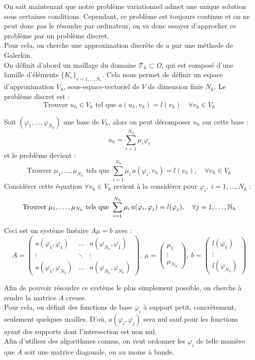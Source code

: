 On sait maintenant que notre problème variationnel admet une unique solution sous certaines conditions. Cependant, ce problème est toujours continue et on ne peut donc pas le résoudre par ordinateur, on va donc essayer d'approcher ce problème par un problème discret.\\
Pour cela, on cherche une approximation discrète de $u$ par une méthode de Galerkin.\\

On définit d'abord un maillage du domaine $\mathcal{T}_h\subset\Omega$, qui est composé d'une famille d'éléments $\{K_e\}_{e=1,\dots,N_e}$. Cela nous permet de définir un espace d'approximation $V_h$, sous-espace-vectoriel de $V$ de dimension finie $N_h$. Le problème discret est :
\[ \mbox{Trouver } u_h\in V_h \mbox{ tel que } a(u_h,v_h)=l(v_h)\quad \forall v_h\in V_h \]

Soit $(\varphi_1,\dots,\varphi_{N_h})$ une base de $V_h$, alors on peut décomposer $u_h$ sur cette base :
\[ u_h = \sum_{i=1}^{N_h} \mu_i\varphi_i \]
et le problème devient :
\[ \mbox{Trouver } \mu_1,\dots,\mu_{N_h} \mbox{ tels que } \sum_{i=1}^{N_h} \mu_i\,a(\varphi_i,v_h)=l(v_h),\quad \forall v_h\in V_h \]
Considérer cette équation $\forall v_h\in V_h$ revient à la considérer pour $\varphi_i,\ i=1,\dots,N_h$ :
\[ \mbox{Trouver } \mu_1,\dots,\mu_{N_h} \mbox{ tels que } \sum_{i=1}^{N_h} \mu_i\,a(\varphi_i,\varphi_j)=l(\varphi_j),\quad \forall j=1,\dots,{\mathbb{N}}_h \]

Ceci est un système linéaire $A\mu = b$ avec :
\[ A=\begin{pmatrix} a(\varphi_1,\varphi_1) & \dots & a(\varphi_{N_h},\varphi_1)\\
\vdots & \ddots & \vdots\\
a(\varphi_1,\varphi_{N_h}) & \dots & a(\varphi_{N_h},\varphi_{N_h}) \end{pmatrix},\ 
\mu=\begin{pmatrix} \mu_1\\ \vdots\\ \mu_{N_h}\end{pmatrix},\ 
b=\begin{pmatrix} l(\varphi_1)\\ \vdots\\ l(\varphi_{N_h}) \end{pmatrix}\]

Afin de pouvoir résoudre ce système le plus simplement possible, on cherche à rendre la matrice $A$ creuse.\\
Pour cela, on définit des fonctions de base $\varphi_i$ à support petit, concrètement, seulement quelques mailles. D'où, $a(\varphi_i,\varphi_j)$ sera nul sauf pour les fonctions ayant des supports dont l'intersection est non nul.\\
Afin d'utiliser des algorithmes connus, on veut ordonner les $\varphi_i$ de telle manière que $A$ soit une matrice diagonale, ou au moins à bande.\\

